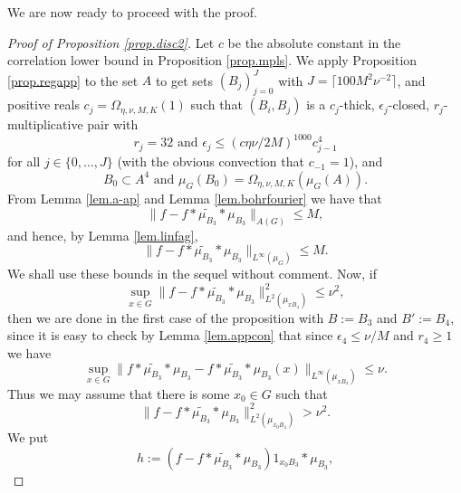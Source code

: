 \documentclass[12pt]{amsart}
\numberwithin{equation}{section}
\theoremstyle{plain}
\theoremstyle{definition}
\renewcommand{\leq}{\leqslant}
\renewcommand{\geq}{\geqslant}
\begin{document}
We are now ready to proceed with the proof.
\begin{proof}[Proof of Proposition \ref{prop.disc2}]
Let $c$ be the absolute constant in the correlation lower bound in Proposition \ref{prop.mpls}.  We apply Proposition \ref{prop.regapp} to the set $A$ to get sets $(B_j)_{j=0}^J$ with $J=\lceil 100 M^2\nu^{-2} \rceil$, and positive reals $c_j=\Omega_{\eta,\nu,M,K}(1)$ such that $(B_i,B_j)$ is a $c_j$-thick, $\epsilon_j$-closed, $r_j$-multiplicative pair with
\begin{equation*}
r_j = 32 \textrm{ and } \epsilon_j \leq (c\eta \nu /2M)^{1000}c_{j-1}^4
\end{equation*}
for all $j \in \{0,\dots,J\}$ (with the obvious convection that $c_{-1}=1$), and
\begin{equation*}
B_0 \subset A^4 \textrm{ and } \mu_G(B_0) = \Omega_{\eta,\nu,M,K}(\mu_G(A)).
\end{equation*}
From Lemma \ref{lem.a-ap} and Lemma \ref{lem.bohrfourier} we have that
\begin{equation*}
\|f -f \ast \widetilde{\mu_{B_3}} \ast \mu_{B_3}\|_{A(G)} \leq M,
\end{equation*}
and hence, by Lemma \ref{lem.linfag},
\begin{equation*}
\|f-f \ast \widetilde{\mu_{B_3}} \ast \mu_{B_3}\|_{L^\infty(\mu_G)}\leq M.
\end{equation*}
We shall use these bounds in the sequel without comment.  Now, if
\begin{equation*}
\sup_{x \in G}{\|f -f \ast \widetilde{\mu_{B_3}} \ast \mu_{B_3}\|_{L^2(\mu_{xB_4})}^2} \leq \nu^2,
\end{equation*}
then we are done in the first case of the proposition with $B:= B_3$ and $B':=B_4$, since it is easy to check by Lemma \ref{lem.appcon} that since $\epsilon_4 \leq \nu/M$ and $r_4 \geq 1$ we have
\begin{equation*}
\sup_{x \in G}{\|f\ast \widetilde{\mu_{B_3}} \ast \mu_{B_3}-f \ast \widetilde{\mu_{B_3}} \ast \mu_{B_3}(x)\|_{L^\infty(\mu_{xB_4})}}\leq \nu.
\end{equation*}
Thus we may assume that there is some $x_0 \in G$ such that
\begin{equation}\label{eqn.juk}
\|f -f \ast \widetilde{\mu_{B_3}} \ast \mu_{B_3}\|_{L^2(\mu_{x_0B_4})}^2 >\nu^2.
\end{equation}
We put
\begin{equation*}
h:=(f -f \ast \widetilde{\mu_{B_3}} \ast \mu_{B_3})1_{x_0B_3} \ast \mu_{B_3},
\end{equation*}

\end{proof}
\end{document}
